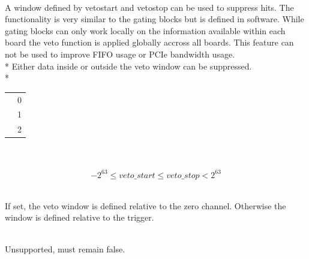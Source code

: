 {	\\
	A window defined by \textsf{veto\tu start} and \textsf{veto\tu stop} can be used to suppress hits. 
	The functionality is very similar to the gating blocks but is defined in software. 
	While gating blocks can only work locally on the information available within each board the veto function is applied globally accross all boards.
	This feature can not be used to improve FIFO usage or PCIe bandwidth usage. 
	 \\*
	Either data inside or outside the veto window can be suppressed.\\*
	\begin{tabular}{lc}
		\ttdef{VETO\tu OFF}     & 0 \\
		\ttdef{VETO\tu INSIDE}  & 1 \\
		\ttdef{VETO\tu OUTSIDE} & 2 \\
	\end{tabular}\par

	\\
	\\
	\[
		-2^{63} \le veto\_ start \le veto\_ stop < 2^{63} 
	\]\par

	\\
	If set, the veto window is defined relative to the zero channel. Otherwise the window is defined relative to the trigger.\par 

	\\
	Unsupported, must remain \textsf{false}.

}{}